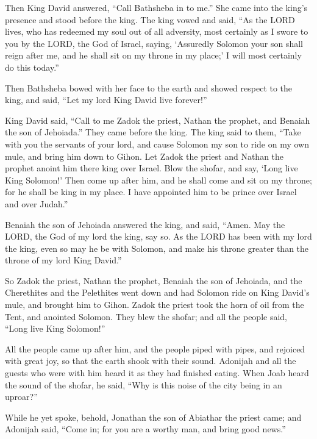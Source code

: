 \myverse{}Then King David answered, “Call Bathsheba in to me.” She came
into the king’s presence and stood before the king.
\myverse{}The king vowed and said, “As the LORD lives, who has redeemed my soul out
of all adversity,
\myverse{}most certainly as I swore to you by the LORD, the God of Israel, saying, ‘Assuredly
Solomon your son shall reign after me, and he shall sit on my throne in my place;’ I will most certainly
do this today.”

\myverse{}Then Bathsheba bowed with her face to the earth and showed respect
to the king, and said, “Let my lord King David live forever!”

\myverse{}King David said, “Call to me Zadok the priest, Nathan the prophet,
and Benaiah the son of Jehoiada.” They came before the king.
\myverse{}The king said to them, “Take with you the servants of your lord, and cause
Solomon my son to ride on my own mule, and bring him down to Gihon.
\myverse{}Let Zadok the priest and Nathan the prophet anoint him there king over Israel.
Blow the shofar, and say, ‘Long live King Solomon!’
\myverse{}Then come up after him, and he shall come and sit on my throne; for he shall
be king in my place. I have appointed him to be prince over Israel and over Judah.”

\myverse{}Benaiah the son of Jehoiada answered the king, and said, “Amen.
May the LORD, the God of my lord the king, say so.
\myverse{}As the LORD has been with my lord the king, even so may he be with Solomon,
and make his throne greater than the throne of my lord King David.”

\myverse{}So Zadok the priest, Nathan the prophet, Benaiah the son of Jehoiada,
and the Cherethites and the Pelethites went down and had Solomon ride on King David’s mule, and brought
him to Gihon.
\myverse{}Zadok the priest took the horn of oil from the Tent, and anointed Solomon.
They blew the shofar; and all the people said, “Long live King Solomon!”

\myverse{}All the people came up after him, and the people piped with pipes,
and rejoiced with great joy, so that the earth shook with their sound.
\myverse{}Adonijah and all the guests who were with him heard it as they had finished
eating. When Joab heard the sound of the shofar, he said, “Why is this noise of the city being in an uproar?”

\myverse{}While he yet spoke, behold, Jonathan the son of Abiathar the
priest came; and Adonijah said, “Come in; for you are a worthy man, and bring good news.”

